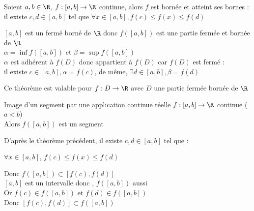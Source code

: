 \documentclass[12pt,a4paper]{report}
\begin{document}
\begin{demo}

\end{demo}

\begin{application}{}{}
Soient $a,b \in \R$, $f:[a,b] \rightarrow \R$ continue, alors $f$ est bornée et atteint ses bornes :\\
il existe $c,d \in [a,b]$ tel que $\forall x \in [a,b], f(c) \leq f(x) \leq f(d)$
\end{application}

\begin{demo}
$[a,b]$ est un fermé borné de $\R$ donc $f([a,b])$ est une partie fermée et bornée de $\R$ \\
$\alpha = \inf f([a,b])$ et $\beta = \sup f([a,b])$\\
$\alpha$ est adhérent à $f(D)$ donc appartient à $f(D)$ car $f(D)$ est fermé : \\
il existe $c \in [a,b], \alpha = f(c)$, de même, $\exists d \in [a,b], \beta = f(d)$
\end{demo}

\begin{remarque}
Ce théorème est valable pour $f : D \rightarrow \R$ avec $D$ une partie fermée bornée de $\R$
\end{remarque}

\begin{theoreme}{Image d'un segment par une application continue réelle}{}
$f : [a,b] \rightarrow \R$ continue ($a<b$)\\
Alors $f([a,b])$ est un segment 
\end{theoreme}

\begin{demo}
D'après le théorème précédent, il existe $c, d \in [a,b]$ tel que : \\
\begin{center}
    $\forall x \in [a,b]$, $f(c) \leq f(x) \leq f(d)$
\end{center}
Donc $f([a,b])\subset [f(c),f(d)]$\\
$[a,b]$ est un intervalle donc , $f([a,b])$ aussi \\
Or $f(c) \in f([a,b])$ et $f(d) \in f([a,b])$\\
Donc $[f(c),f(d)] \subset f([a,b])$
\end{demo}

\begin{remarque}[Attention !!!]

\end{remarque}
\end{document}
